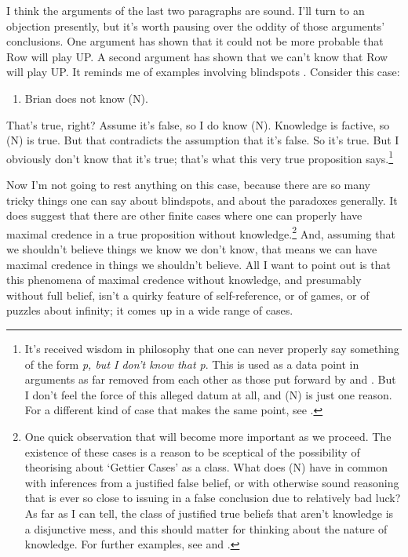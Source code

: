\documentclass[11pt,]{book}
\providecommand{\tightlist}{%
  \setlength{\itemsep}{0pt}\setlength{\parskip}{0pt}}
\let\rmarkdownfootnote\footnote%
\def\footnote{\protect\rmarkdownfootnote}
\begin{document}
I think the arguments of the last two paragraphs are sound. I'll turn to an objection presently, but it's worth pausing over the oddity of those arguments' conclusions. One argument has shown that it could not be more probable that Row will play UP. A second argument has shown that we can't know that Row will play UP. It reminds me of examples involving blindspots
\citep{Sorensen1988}. Consider this case:

\begin{enumerate}
\def\labelenumi{(\Alph{enumi})}
\setcounter{enumi}{13}
\tightlist
\item
  Brian does not know (N).
\end{enumerate}

That's true, right? Assume it's false, so I do know (N). Knowledge is factive, so (N) is true. But that contradicts the assumption that it's false. So it's true. But I obviously don't know that it's true; that's what this very true proposition says.\footnote{It's received wisdom in philosophy that one can never properly say something of the form \emph{p, but I don't know that p}. This is used as a data point in arguments as far removed from each other as those put forward by \citet{Heal1994} and \citet{Williamson1996-WILKAA}. But I don't feel the force of this alleged datum at all, and (N) is just one reason. For a different kind of case that makes the same point, see \citet{MaitraWeatherson}.}

Now I'm not going to rest anything on this case, because there are so many tricky things one can say about blindspots, and about the paradoxes generally. It does suggest that there are other finite cases where one can properly have maximal credence in a true proposition without knowledge.\footnote{One quick observation that will become more important as we proceed. The existence of these cases is a reason to be sceptical of the possibility of theorising about `Gettier Cases' as a class. What does (N) have in common with inferences from a justified false belief, or with otherwise sound reasoning that is ever so close to issuing in a false conclusion due to relatively bad luck? As far as I can tell, the class of justified true beliefs that aren't knowledge is a disjunctive mess, and this should matter for thinking about the nature of knowledge. For further examples, see \citet{Williamson2013-WILGCI} and \citet{Nagel2013-Williamson}.} And, assuming that we shouldn't believe things we know we don't know, that means we can have maximal credence in things we shouldn't believe. All I want to point out is that this phenomena of maximal credence without knowledge, and presumably without full belief, isn't a quirky feature of self-reference, or of games, or of puzzles about infinity; it comes up in a wide range of cases.
\end{document}
